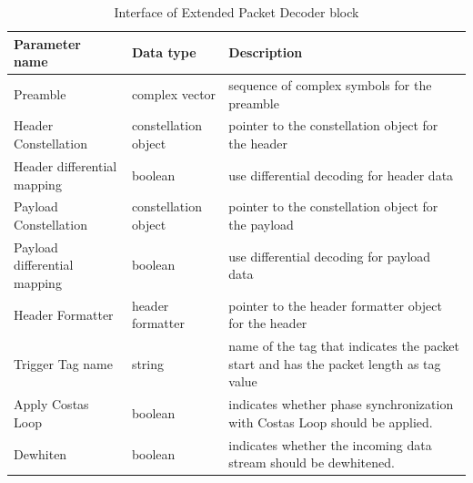 \vspace*{-0.5cm}
\begin{table}[H]
\begin{center}
\begin{tabular}{|l|l|p{6cm}|}
\hline
Parameter name & Data type & Description\\
\hline
\hline

Preamble & complex vector & sequence of complex symbols for the preamble\\
\hline
Header Constellation & constellation object & pointer to the constellation object for the header\\
\hline
    Header differential mapping & boolean & use differential decoding for header data\\
\hline
Payload Constellation & constellation object & pointer to the constellation object for the payload\\
\hline
    Payload differential mapping & boolean & use differential decoding for payload data\\
\hline
Header Formatter & header formatter & pointer to the header formatter object for the header\\
\hline
Trigger Tag name & string & name of the tag that indicates the packet start and has the packet length as tag value\\
\hline
Apply Costas Loop & boolean & indicates whether phase synchronization with Costas Loop should be applied.\\
\hline
    Dewhiten & boolean & indicates whether the incoming data stream should be dewhitened.\\
    \hline
\end{tabular}
\caption{Interface of Extended Packet Decoder block}
\label{dec_interface}
\end{center}
\end{table}

\vspace*{-0.7cm}
\newpage
